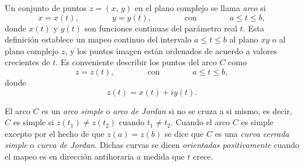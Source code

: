 \documentclass[a4paper]{report}
\begin{document}
Un conjunto de puntos \(z=(x,\,y)\) en el plano complejo se llama \emph{arco} si
\begin{equation*}
 x=x(t),\qquad\qquad y=y(t),\qquad\qquad\textrm{con}\qquad\qquad a\leq t\leq b,
\end{equation*}
donde \(x(t)\) y \(y(t)\) son funciones continuas del parámetro real \(t\). Esta definición establece un mapeo continuo del intervalo \(a\leq t\leq b\) al plano \(xy\) o al plano complejo \(z\), y los puntos imagen están ordenados de acuerdo a valores crecientes de \(t\). Es conveniente describir los puntos del arco \(C\) como
\begin{equation}\label{eq:contours_arc_definition_complex}
 z=z(t),\qquad\qquad\textrm{con}\qquad\qquad a\leq t\leq b,
\end{equation}
donde 
\begin{equation}\label{eq:contours_arc_definition_complex_components}
 z(t)=x(t)+iy(t). 
\end{equation}


El arco \(C\) es un \emph{arco simple} o \emph{arco de Jordan} si no se cruza a si mismo, es decir, \(C\) es simple si \(z(t_1)\neq z(t_2)\) cuando \(t_1\neq t_2\). Cuando el arco \(C\) es simple excepto por el hecho de que \(z(a)=z(b)\) se dice que \(C\) es una \emph{curva cerrada simple} o \emph{curva de Jordan}. Dichas curvas se dicen \emph{orientadas positivamente} cuando el mapeo es en dirección antihoraria a medida que \(t\) crece.
\end{document}
